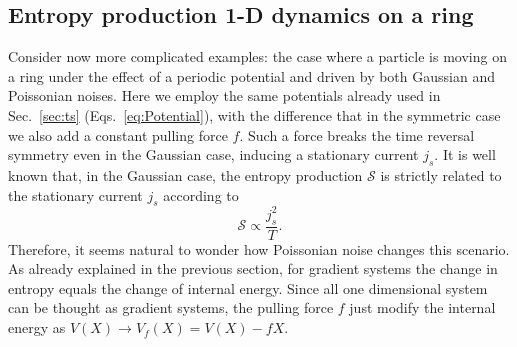 \documentclass[12pt]{iopart}
\newcommand{\lx} {\left}
\newcommand{\rx} {\right}
\newcommand{\cS} {\mathcal{S}}
\newcommand{\cT} {\mathcal{T}}
\begin{document}
\subsection{Entropy production 1-D dynamics on a ring}
Consider now more complicated examples: the case where a particle is moving on a ring under the effect of a periodic potential and driven by both Gaussian and Poissonian noises. Here we employ the same potentials already used in Sec.~\ref{sec:ts} (Eqs.~\ref{eq:Potential}), with the difference that in the symmetric case we also add a constant pulling force $f$. Such a force breaks the time reversal symmetry even in the Gaussian case, inducing a stationary current $j_s$. It is well known that, in the Gaussian case, the entropy production $\cS$ is strictly related to the stationary current $j_s$ according to
\begin{equation}
\cS\propto \frac{j_s^2}{T}.
\end{equation}
Therefore, it seems natural to wonder how Poissonian noise changes this scenario. As already explained in the previous section, for gradient systems the change in entropy equals the change of internal energy. Since all one dimensional system can be thought as gradient systems, the pulling force $f$ just modify the internal energy as
$V(X)\to V_f(X)=V(X)-fX$.
\end{document}

